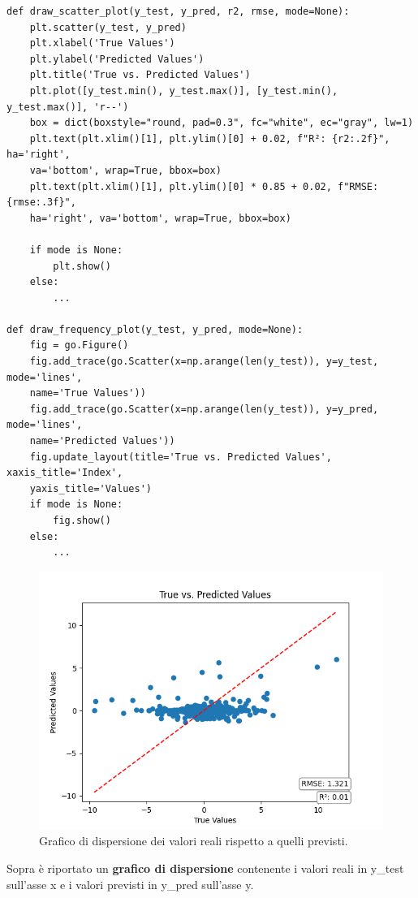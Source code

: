 \documentclass{article}
\begin{document}
\begin{verbatim}
def draw_scatter_plot(y_test, y_pred, r2, rmse, mode=None):
    plt.scatter(y_test, y_pred)
    plt.xlabel('True Values')
    plt.ylabel('Predicted Values')
    plt.title('True vs. Predicted Values')
    plt.plot([y_test.min(), y_test.max()], [y_test.min(), y_test.max()], 'r--')
    box = dict(boxstyle="round, pad=0.3", fc="white", ec="gray", lw=1)
    plt.text(plt.xlim()[1], plt.ylim()[0] + 0.02, f"R²: {r2:.2f}", ha='right',
    va='bottom', wrap=True, bbox=box)
    plt.text(plt.xlim()[1], plt.ylim()[0] * 0.85 + 0.02, f"RMSE: {rmse:.3f}", 
    ha='right', va='bottom', wrap=True, bbox=box)

    if mode is None:
        plt.show()
    else:
        ...

def draw_frequency_plot(y_test, y_pred, mode=None):
    fig = go.Figure()
    fig.add_trace(go.Scatter(x=np.arange(len(y_test)), y=y_test, mode='lines',
    name='True Values'))
    fig.add_trace(go.Scatter(x=np.arange(len(y_test)), y=y_pred, mode='lines',
    name='Predicted Values'))
    fig.update_layout(title='True vs. Predicted Values', xaxis_title='Index',
    yaxis_title='Values')
    if mode is None:
        fig.show()
    else:
        ...
\end{verbatim}
\begin{figure}[H]
\centering
\includegraphics[width=1\linewidth]{Figure_1.png}
\caption{\label{fig:scatter_plot}Grafico di dispersione dei valori reali rispetto a quelli previsti.}
\end{figure}
Sopra è riportato un \textbf{grafico di dispersione} contenente i valori reali in y\_test sull'asse x e i valori previsti in y\_pred sull'asse y.
\end{document}
